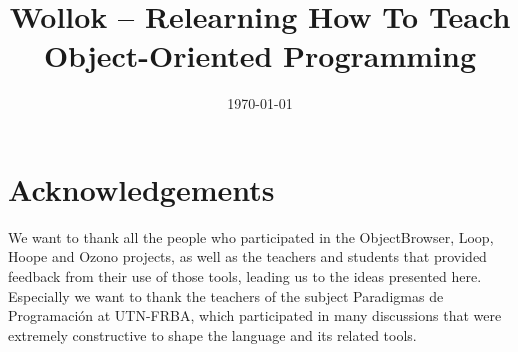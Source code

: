 \documentclass[conference, a4paper]{IEEEtran}
\begin{document}
\title{Wollok -- Relearning How To Teach \\ Object-Oriented Programming}

% 

\date{\today}
\maketitle













\section*{Acknowledgements}
We want to thank all the people who participated in the ObjectBrowser, Loop, Hoope and Ozono projects, 
as well as the teachers and students that provided feedback from their use of those tools, leading us to the ideas presented here.
Especially we want to thank the teachers of the subject Paradigmas de Programación at UTN-FRBA, 
which participated in many discussions that were extremely constructive to shape the language and its related tools.

{
\small


}
\end{document}
